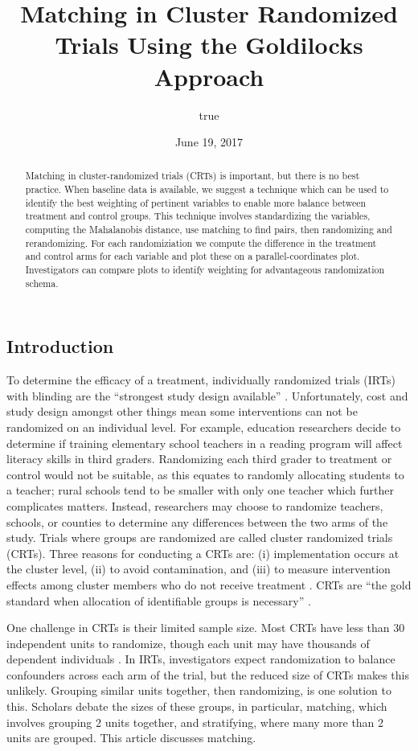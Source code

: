 \documentclass[]{sagej}
\title{Matching in Cluster Randomized Trials Using the Goldilocks Approach}
\author{true}
\date{June 19, 2017}
\begin{document}
\maketitle
\begin{abstract}
Matching in cluster-randomized trials (CRTs) is important, but there is
no best practice. When baseline data is available, we suggest a
technique which can be used to identify the best weighting of pertinent
variables to enable more balance between treatment and control groups.
This technique involves standardizing the variables, computing the
Mahalanobis distance, use matching to find pairs, then randomizing and
rerandomizing. For each randomiziation we compute the difference in the
treatment and control arms for each variable and plot these on a
parallel-coordinates plot. Investigators can compare plots to identify
weighting for advantageous randomization schema.
\end{abstract}

\subsection{Introduction}\label{introduction}

To determine the efficacy of a treatment, individually randomized trials
(IRTs) with blinding are the ``strongest study design available''
\citep{gatsonis2017methods}. Unfortunately, cost and study design
amongst other things mean some interventions can not be randomized on an
individual level. For example, education researchers decide to determine
if training elementary school teachers in a reading program will affect
literacy skills in third graders. Randomizing each third grader to
treatment or control would not be suitable, as this equates to randomly
allocating students to a teacher; rural schools tend to be smaller with
only one teacher which further complicates matters. Instead, researchers
may choose to randomize teachers, schools, or counties to determine any
differences between the two arms of the study. Trials where groups are
randomized are called cluster randomized trials (CRTs). Three reasons
for conducting a CRTs are: (i) implementation occurs at the cluster
level, (ii) to avoid contamination, and (iii) to measure intervention
effects among cluster members who do not receive treatment
\citep{balzer2012match, CRTrials2009}. CRTs are ``the gold standard when
allocation of identifiable groups is necessary''
\citep{murray2004design}.

One challenge in CRTs is their limited sample size. Most CRTs have less
than 30 independent units to randomize, though each unit may have
thousands of dependent individuals \citep{balzer2012match}. In IRTs,
investigators expect randomization to balance confounders across each
arm of the trial, but the reduced size of CRTs makes this unlikely.
Grouping similar units together, then randomizing, is one solution to
this. Scholars debate the sizes of these groups, in particular,
matching, which involves grouping 2 units together, and stratifying,
where many more than 2 units are grouped\citep{PMVsStrat}. This article
discusses matching.
\end{document}
